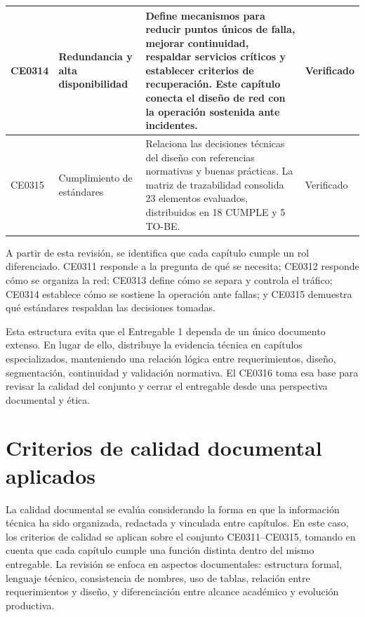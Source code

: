 \documentclass[11pt, a4paper, oneside]{report}
\begin{document}
\begin{xltabular}{\textwidth}{@{}|L{2.2cm}|L{3.6cm}|X|L{2.4cm}|@{}}
{\small CE0314} &
{\small Redundancia y alta disponibilidad} &
{\small Define mecanismos para reducir puntos únicos de falla, mejorar continuidad, respaldar servicios críticos y establecer criterios de recuperación. Este capítulo conecta el diseño de red con la operación sostenida ante incidentes.} &
{\small Verificado} \\ \hline

{\small CE0315} &
{\small Cumplimiento de estándares} &
{\small Relaciona las decisiones técnicas del diseño con referencias normativas y buenas prácticas. La matriz de trazabilidad consolida 23 elementos evaluados, distribuidos en 18 CUMPLE y 5 TO-BE.} &
{\small Verificado} \\ \hline

\end{xltabular}

\normalsize

A partir de esta revisión, se identifica que cada capítulo cumple un rol diferenciado. CE0311 responde a la pregunta de qué se necesita; CE0312 responde cómo se organiza la red; CE0313 define cómo se separa y controla el tráfico; CE0314 establece cómo se sostiene la operación ante fallas; y CE0315 demuestra qué estándares respaldan las decisiones tomadas.

Esta estructura evita que el Entregable 1 dependa de un único documento extenso. En lugar de ello, distribuye la evidencia técnica en capítulos especializados, manteniendo una relación lógica entre requerimientos, diseño, segmentación, continuidad y validación normativa. El CE0316 toma esa base para revisar la calidad del conjunto y cerrar el entregable desde una perspectiva documental y ética.

\section{Criterios de calidad documental aplicados}

La calidad documental se evalúa considerando la forma en que la información técnica ha sido organizada, redactada y vinculada entre capítulos. En este caso, los criterios de calidad se aplican sobre el conjunto CE0311--CE0315, tomando en cuenta que cada capítulo cumple una función distinta dentro del mismo entregable. La revisión se enfoca en aspectos documentales: estructura formal, lenguaje técnico, consistencia de nombres, uso de tablas, relación entre requerimientos y diseño, y diferenciación entre alcance académico y evolución productiva.
\end{document}
